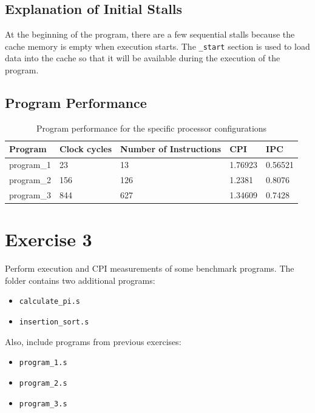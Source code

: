 \documentclass[a4paper,12pt]{article}
\begin{document}
\subsection*{Explanation of Initial Stalls}

At the beginning of the program, there are a few sequential stalls because the cache memory is empty when execution starts. The \texttt{\_start} section is used to load data into the cache so that it will be available during the execution of the program.

\subsection*{Program Performance}

\begin{table}[h!]
\centering
\caption{Program performance for the specific processor configurations}
\begin{tabularx}{\textwidth}{|X|X|X|X|X|}
\hline
\textbf{Program} & \textbf{Clock cycles} & \textbf{Number of Instructions} & \textbf{CPI} & \textbf{IPC} \\
\hline
program\_1 & 23  & 13  & 1.76923 & 0.56521 \\
program\_2 & 156 & 126 & 1.2381  & 0.8076  \\
program\_3 & 844 & 627 & 1.34609 & 0.7428  \\
\hline
\end{tabularx}
\end{table}

\newpage
\section*{Exercise 3}

Perform execution and CPI measurements of some benchmark programs. The folder contains two additional programs:

\begin{itemize}
    \item \texttt{calculate\_pi.s}
    \item \texttt{insertion\_sort.s}
\end{itemize}

Also, include programs from previous exercises:
\begin{itemize}
    \item \texttt{program\_1.s}
    \item \texttt{program\_2.s}
    \item \texttt{program\_3.s}
\end{itemize}
\end{document}
